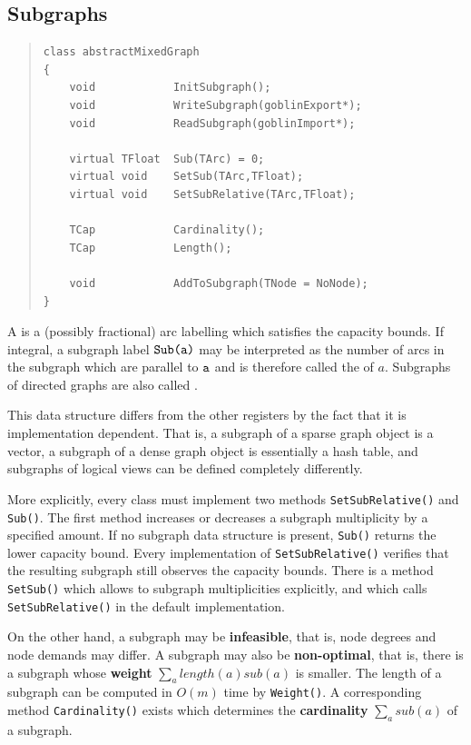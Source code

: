 \documentclass[a4paper,11pt,twoside]{book}
\begin{document}
\begin{multicols}{2}
\subsection{Subgraphs}
\label{slb_sub}
\methods
\begin{quote}
\begin{verbatim}
class abstractMixedGraph
{
    void            InitSubgraph();
    void            WriteSubgraph(goblinExport*);
    void            ReadSubgraph(goblinImport*);

    virtual TFloat  Sub(TArc) = 0;
    virtual void    SetSub(TArc,TFloat);
    virtual void    SetSubRelative(TArc,TFloat);

    TCap            Cardinality();
    TCap            Length();

    void            AddToSubgraph(TNode = NoNode);
}
\end{verbatim}
\end{quote}
A  is a (possibly fractional) arc labelling which satisfies the
capacity bounds. If integral, a subgraph label $\verb/Sub(a)/$ may be interpreted
as the number of arcs in the subgraph which are parallel to $\verb/a/$ and is
therefore called the  of $a$. Subgraphs of directed
graphs are also called .

This data structure differs from the other registers by the fact that it is
implementation dependent. That is, a subgraph of a sparse graph
object is a vector, a subgraph of a dense graph object is essentially a hash
table, and subgraphs of logical views can be defined completely differently.

More explicitly, every class must implement two methods \verb/SetSubRelative()/
and \verb/Sub()/. The first method increases or decreases a subgraph multiplicity
by a specified amount. If no subgraph data structure is present, \verb/Sub()/
returns the lower capacity bound. Every implementation of \verb/SetSubRelative()/
verifies that the resulting subgraph still observes the capacity bounds. There is
a method \verb/SetSub()/ which allows to subgraph multiplicities explicitly, and
which calls \verb/SetSubRelative()/ in the default implementation.

On the other hand, a subgraph may be {\bf infeasible},
that is, node degrees and node demands may differ. A subgraph may also be
{\bf non-optimal}, that is, there is a subgraph
whose {\bf weight} $\sum_a length(a)sub(a)$ is smaller.
The length of a subgraph can be computed in $O(m)$ time by \verb/Weight()/.
A corresponding method \verb/Cardinality()/ exists which determines the
{\bf cardinality} $\sum_a sub(a)$ of a subgraph.


\end{multicols}
\end{document}
